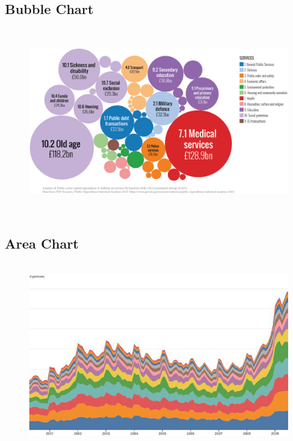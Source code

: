 \documentclass[12pt]{article}
\begin{document}
\subsection*{Bubble Chart}
\begin{figure}[h]
    \centering
    \includegraphics[width=13cm, height=8cm]{bubble-chart.png}
    \centering
\end{figure}

\subsection*{Area Chart}
\begin{figure}[h]
    \centering
    \includegraphics[width=13cm, height=8cm]{area-chart.png}
    \centering
\end{figure}
\end{document}
